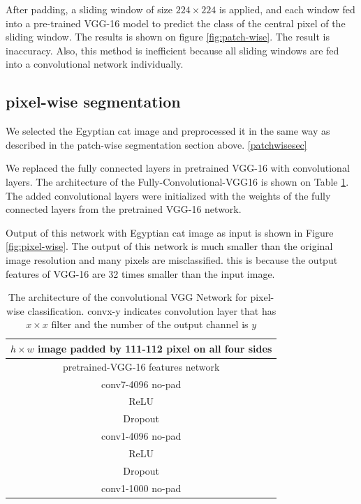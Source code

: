 \documentclass[extendedabs]{bmvc2k}
\begin{document}
After padding, a sliding window of size $224\times224$ is applied, and each window fed into a pre-trained VGG-16\cite{vggnet} model to predict the class of the central pixel of the sliding window. The results is shown on figure \ref{fig:patch-wise}. The result is inaccuracy. Also, this method is inefficient because all sliding windows are fed into a convolutional network individually.
\subsection{pixel-wise segmentation} \label{pixelwisesec}
We selected the Egyptian cat image and preprocessed it in the same way as described in the patch-wise segmentation section above. \ref{patchwisesec}

We replaced the fully connected layers in pretrained VGG-16\cite{vggnet} with convolutional layers. The architecture of the Fully-Convolutional-VGG16 is shown on Table \ref{tab:convvgg}. The added convolutional layers were initialized with the weights of the fully connected layers from the pretrained VGG-16\cite{vggnet} network.

Output of this network with Egyptian cat image as input is shown in Figure \ref{fig:pixel-wise}. The output of this network is much smaller than the original image resolution and many pixels are misclassified. this is because the output features of VGG-16 are 32 times smaller than the input image.
\begin{table}[]
\centering
\begin{tabular}{|c|}
\hline
$h \times w$ image padded by 111-112 pixel on all four sides \\ \hline
pretrained-VGG-16 features network                                        \\ \hline
conv7-4096 no-pad                                                         \\ \hline
ReLU                                                                      \\ \hline
Dropout                                                                   \\ \hline
conv1-4096 no-pad                                                         \\ \hline
ReLU                                                                      \\ \hline
Dropout                                                                   \\ \hline
conv1-1000 no-pad                                                         \\ \hline
\end{tabular}
\caption{The architecture of the convolutional VGG Network for pixel-wise classification. convx-y indicates convolution layer that has $x\times x$ filter and the number of the output channel is $y$}
\label{tab:convvgg}
\end{table}
\end{document}
